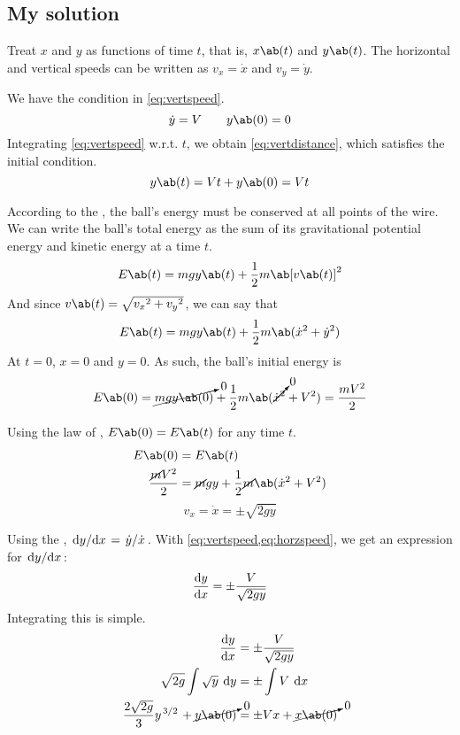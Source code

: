 \subsection{My solution}
Treat \(x\) and \(y\) as functions of time \(t\), that is,
\(x\ab(t)\) and \(y\ab(t)\). The horizontal and vertical speeds can
be written as \(v_x = \dot{x}\) and \(v_y = \dot{y}\).

We have the condition in \cref{eq:vertspeed}.
\begin{equation}
  \dot{y} = V\qquad y\ab(0) = 0
  \label{eq:vertspeed}
\end{equation}
Integrating \cref{eq:vertspeed} w.r.t. \(t\), we obtain
\cref{eq:vertdistance}, which satisfies the initial condition.
\begin{equation}
  y\ab(t) = Vt + y\ab(0) = Vt
  \label{eq:vertdistance}
\end{equation}

According to the , the ball's
energy must be conserved at all points of the wire. We can write the
ball's total energy as the sum of its gravitational potential energy
and kinetic energy at a time \(t\).
\begin{equation*}
  E\ab(t) = mgy\ab(t) + \f{1}{2}m\ab[v\ab(t)]^2
\end{equation*}
And since \(v\ab(t) = \sqrt{{v_x}^2 + {v_y}^2}\), we can say that
\begin{equation}
  E\ab(t) = mgy\ab(t) + \f{1}{2}m\ab(\dot{x}^2 + \dot{y}^2)
\end{equation}
At \(t = 0\), \(x = 0\) and \(y = 0\). As such, the ball's initial energy is
\begin{align*}
  E\ab(0) = \cancelto{0}{mgy\ab(0)} +
  \f{1}{2}m\ab(\cancelto{0}{\dot{x}^2} + V^2)
  = \f{mV^2}{2}
\end{align*}

Using the law of , \(E\ab(0) = E\ab(t)\)
for any time \(t\).
\begin{align*}
  E\ab(0) &= E\ab(t)\\
  \f{\cancel{m}V^2}{2} &= \cancel{m}gy + \f{1}{2}\cancel{m}\ab(\dot{x}^2 + V^2)
\end{align*}
\begin{equation}
  \label{eq:horzspeed}
  v_x = \dot{x} = \pm\sqrt{2gy}
\end{equation}

Using the , \(\odv{y}/{x} = \lf{\dot{y}}{\dot{x}}\).
With \cref{eq:vertspeed,eq:horzspeed}, we get an expression for \(\odv{y}/{x}\):
\begin{equation}
  \odv{y}{x} = \pm\f{V}{\sqrt{2gy}}
\end{equation}
Integrating this is simple.
\begin{align*}
  \odv{y}{x} &= \pm\f{V}{\sqrt{2gy}} \\
  \sqrt{2g}\int\sqrt{y}\:\odif{y} &= \pm\int V\:\odif{x}  \\
  \f{2\sqrt{2g}}{3}y^{\lf{3}{2}} + \cancelto{0}{y\ab(0)} &= \pm Vx +
  \cancelto{0}{x\ab(0)}
\end{align*}

